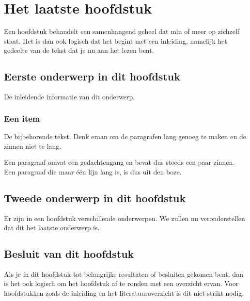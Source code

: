 \chapter{Het laatste hoofdstuk}
\label{hoofdstuk:4}
Een hoofdstuk behandelt een samenhangend geheel dat min of meer op zichzelf
staat. Het is dan ook logisch dat het begint met een inleiding, namelijk
het gedeelte van de tekst dat je nu aan het lezen bent.

\section{Eerste onderwerp in dit hoofdstuk}
De inleidende informatie van dit onderwerp.

\subsection{Een item}
De bijbehorende tekst. Denk eraan om de paragrafen lang genoeg te maken en
de zinnen niet te lang.

Een paragraaf omvat een gedachtengang en bevat dus steeds een paar zinnen.
Een paragraaf die maar \'e\'en lijn lang is, is dus uit den boze.

\section{Tweede onderwerp in dit hoofdstuk}
Er zijn in een hoofdstuk verschillende onderwerpen. We zullen nu
veronderstellen dat dit het laatste onderwerp is.

\section{Besluit van dit hoofdstuk}
Als je in dit hoofdstuk tot belangrijke resultaten of besluiten gekomen
bent, dan is het ook logisch om het hoofdstuk af te ronden met een
overzicht ervan. Voor hoofdstukken zoals de inleiding en het
literatuuroverzicht is dit niet strikt nodig.

